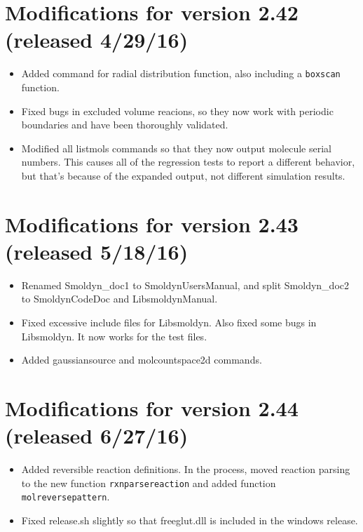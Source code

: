\documentclass {scrbook}
\newcommand {\ttt} {\texttt}
\begin{document}
\section{Modifications for version 2.42 (released 4/29/16)}
\begin{itemize}
\item Added command for radial distribution function, also including a \ttt{boxscan} function.
\item Fixed bugs in excluded volume reacions, so they now work with periodic boundaries and have been thoroughly validated.
\item Modified all listmols commands so that they now output molecule serial numbers. This causes all of the regression tests to report a different behavior, but that's because of the expanded output, not different simulation results.
\end{itemize}

\section{Modifications for version 2.43 (released 5/18/16)}
\begin{itemize}
\item Renamed Smoldyn\_doc1 to SmoldynUsersManual, and split Smoldyn\_doc2 to SmoldynCodeDoc and LibsmoldynManual.
\item Fixed excessive include files for Libsmoldyn. Also fixed some bugs in Libsmoldyn. It now works for the test files.
\item Added gaussiansource and molcountspace2d commands.
\end{itemize}

\section{Modifications for version 2.44 (released 6/27/16)}
\begin{itemize}
\item Added reversible reaction definitions. In the process, moved reaction parsing to the new function \ttt{rxnparsereaction} and added function \ttt{molreversepattern}.
\item Fixed release.sh slightly so that freeglut.dll is included in the windows release.
\end{itemize}
\end{document}
